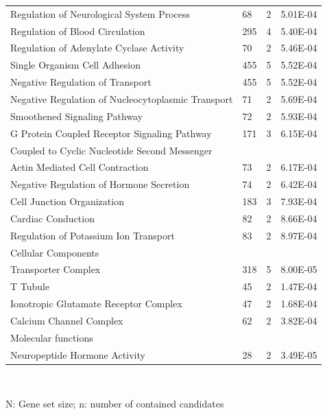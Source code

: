 \begin{refsection}
\begin{table}[H]
\small
{}\selectfont
\label{table3S12v1}
\centering
\begin{tabular}{@{}llll@{}}
\hline
Regulation of Neurological System Process           & 68  & 2 & 5.01E-04         \\
Regulation of Blood Circulation                     & 295 & 4 & 5.40E-04         \\
Regulation of Adenylate Cyclase Activity            & 70  & 2 & 5.46E-04         \\
Single Organism Cell Adhesion                       & 455 & 5 & 5.52E-04         \\
Negative Regulation of Transport                    & 455 & 5 & 5.52E-04         \\
Negative Regulation of Nucleocytoplasmic Transport  & 71  & 2 & 5.69E-04         \\
Smoothened Signaling Pathway                        & 72  & 2 & 5.93E-04         \\
G Protein Coupled Receptor Signaling Pathway        & 171 & 3 & 6.15E-04         \\
Coupled to Cyclic Nucleotide Second Messenger       &     &   &                  \\
Actin Mediated Cell Contraction                     & 73  & 2 & 6.17E-04         \\
Negative Regulation of Hormone Secretion            & 74  & 2 & 6.42E-04         \\
Cell Junction Organization                          & 183 & 3 & 7.93E-04         \\
Cardiac Conduction                                  & 82  & 2 & 8.66E-04         \\
Regulation of Potassium Ion Transport               & 83  & 2 & 8.97E-04         \\
Cellular Components                                 &     &   &                  \\
Transporter Complex                                 & 318 & 5 & 8.00E-05         \\
T Tubule                                            & 45  & 2 & 1.47E-04         \\
Ionotropic Glutamate Receptor Complex               & 47  & 2 & 1.68E-04         \\
Calcium Channel Complex                             & 62  & 2 & 3.82E-04         \\
Molecular functions                                 &     &   &                  \\
Neuropeptide Hormone Activity                       & 28  & 2 & 3.49E-05         \\ \hline
\end{tabular}\\
{\begin{flushleft}
\scriptsize N: Gene set size; n: number of contained candidates
\end{flushleft}}
\end{table}



\end{refsection}

